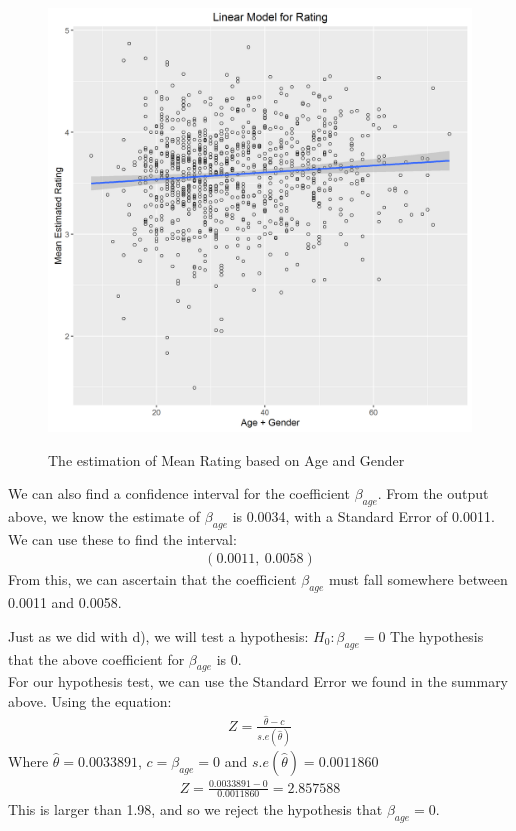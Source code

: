 \documentclass[11pt]{article}  %
\begin{document}
\begin{enumerate}
    \begin{figure}[h]
    \centering
    \caption{The estimation of Mean Rating based on Age and Gender}
    \includegraphics[scale=.50]{regression}
    \label{fig:regres}
    \end{figure}
    
    We can also find a confidence interval for the coefficient $\beta_{age}$. From the output above, we know the estimate of $\beta_{age}$ is 0.0034, with a Standard Error of 0.0011. We can use these to find the interval:
    \begin{align*}
        (0.0011,\ 0.0058)
    \end{align*}
    From this, we can ascertain that the coefficient $\beta_{age}$ must fall somewhere between 0.0011 and 0.0058.
    
    Just as we did with d), we will test a hypothesis: $H_0 : \beta_{age} = 0$ The hypothesis that the above coefficient for $\beta_{age}$ is 0.\\
    For our hypothesis test, we can use the Standard Error we found in the summary above.
    Using the equation:
    \begin{align*}
        Z = \frac{\hat{\theta} - c}{s.e(\hat{\theta})}
    \end{align*}
    Where $\hat{\theta} = 0.0033891$, $c = \beta_{age} = 0$ and $s.e(\hat{\theta}) = 0.0011860$
    \begin{align*}
        Z = \frac{0.0033891 - 0}{0.0011860} = 2.857588
    \end{align*}
    This is larger than 1.98, and so we reject the hypothesis that $\beta_{age} = 0$.
    

\end{enumerate}
\end{document}
